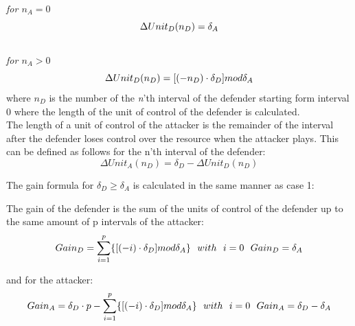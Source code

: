 \textit{for $n_{A} = 0$}
\begin{equation}\label{first}
\Delta Unit_{D}(n_{D}) = \delta_{A} \\
\end{equation}
\\ 
\textit{for $n_{A} > 0$}
\begin{equation}\label{first}
\Delta Unit_{D}(n_{D}) =  [( - n_{D}  ) \cdot \delta_{D}] mod \delta_{A}\\
\end{equation}
where $n_{D}$ is the number of the \textit{n}'th interval of the defender starting form interval 0 where the length of the unit of control of the defender is calculated.\\

The length of a unit of control of the attacker is the remainder of the interval after the defender loses control over the resource when the attacker plays. This can be defined as follows for the n'th interval of the defender:
\begin{equation}\label{first}
\Delta Unit_{A}(n_{D}) = \delta_{D} - \Delta Unit_{D}(n_{D})
\end{equation}

The gain formula for $\delta_{D} \geq \delta_{A}$ is calculated in the same manner as case 1:

The gain of the defender is the sum of the units of control of the defender up to the same amount of p intervals of the attacker:
\begin{equation}\label{first}
Gain_{D} =\sum_{i=1}^{p} \lbrace [( - i ) \cdot \delta_{D}] mod \delta_{A} \rbrace   ~~with~~ i=0 ~~ Gain_{D}=\delta_{A}\\ 
\end{equation}

and for the attacker:
\begin{equation}\label{first}
Gain_{A} =\delta_{D} \cdot p - \sum_{i=1}^{p} \lbrace [( - i ) \cdot \delta_{D}] mod \delta_{A} \rbrace   ~~with~~ i=0 ~~ Gain_{A}=\delta_{D} - \delta_{A}\\ 
\end{equation}

